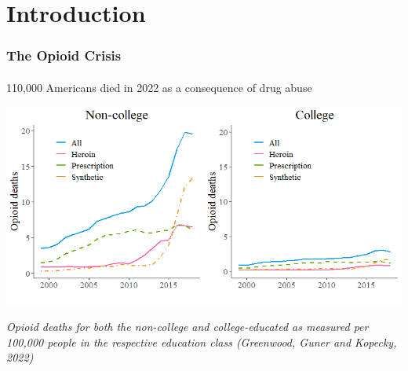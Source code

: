 \section{Introduction}

\begin{frame}

    \frametitle{The Opioid Crisis} %
    \framesubtitle{}  %
    \rmfamily %

    \begin{wideitemize}
        \item 110,000 Americans died in 2022 as a consequence of drug abuse
    \end{wideitemize}

    \begin{center}
        \includegraphics[scale=0.5]{ODD.png}
    \end{center}

    {\footnotesize \textit{Opioid deaths for both the non-college and college-educated as measured per 100,000 people in the respective education class (\textcolor{fgre}{Greenwood, Guner and Kopecky, 2022})}}
    
\end{frame}

